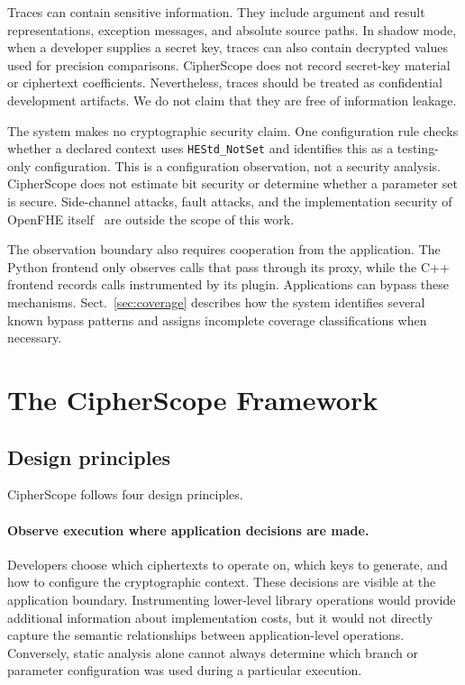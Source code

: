 \documentclass[pdflatex,sn-basic,Numbered,iicol]{sn-jnl}
\begin{document}
Traces can contain sensitive information. They include argument and result
representations, exception messages, and absolute source paths. In shadow
mode, when a developer supplies a secret key, traces can also contain
decrypted values used for precision comparisons. CipherScope does not record
secret-key material or ciphertext coefficients. Nevertheless, traces should
be treated as confidential development artifacts. We do not claim that they
are free of information leakage.

The system makes no cryptographic security claim. One configuration rule
checks whether a declared context uses \texttt{HEStd\_NotSet} and identifies
this as a testing-only configuration. This is a configuration observation,
not a security analysis. CipherScope does not estimate bit security or
determine whether a parameter set is secure. Side-channel attacks, fault
attacks, and the implementation security of OpenFHE
itself~\cite{safetycentric2025} are outside the scope of this work.

The observation boundary also requires cooperation from the application. The
Python frontend only observes calls that pass through its proxy, while the
C++ frontend records calls instrumented by its plugin. Applications can
bypass these mechanisms. Sect.~\ref{sec:coverage} describes how the system
identifies several known bypass patterns and assigns incomplete coverage
classifications when necessary.

\section{The CipherScope Framework}
\label{sec:framework}

\subsection{Design principles}
\label{sec:principles}

CipherScope follows four design principles.

\paragraph{Observe execution where application decisions are made.}
Developers choose which ciphertexts to operate on, which keys to generate,
and how to configure the cryptographic context. These decisions are visible
at the application boundary. Instrumenting lower-level library operations
would provide additional information about implementation costs, but it would
not directly capture the semantic relationships between application-level
operations. Conversely, static analysis alone cannot always determine which
branch or parameter configuration was used during a particular execution.
\end{document}
